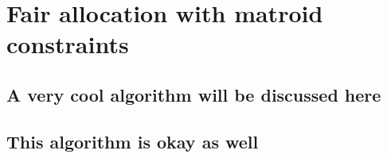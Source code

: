 \chapter{Fair allocation with matroid constraints}
\skelpars[2]

\section{A very cool algorithm will be discussed here}
\skelpars[12]

\section{This algorithm is okay as well}
\skelpars[8]